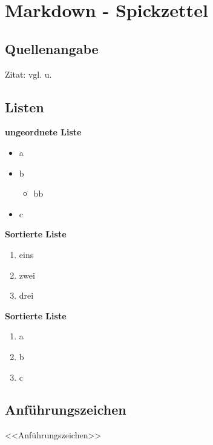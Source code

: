 \section{Markdown - Spickzettel}\label{markdown-spickzettel}

\subsection{Quellenangabe}\label{quellenangabe}

Zitat: vgl. \cite{monk_action_buch:2016} u. \cite{kofler_linux:2017}

\subsection{Listen}\label{listen}

\textbf{ungeordnete Liste}

\begin{itemize}%
\item
  a
\item
  b

  \begin{itemize}%
  \item
    bb
  \end{itemize}
\item
  c
\end{itemize}

\textbf{Sortierte Liste}

\begin{enumerate}%
\item
  eins
\item
  zwei
\item
  drei
\end{enumerate}

\textbf{Sortierte Liste}

\begin{enumerate}%
\def\labelenumi{\alph{enumi})}
\item
  a
\item
  b
\item
  c
\end{enumerate}

\subsection{Anführungszeichen}\label{anfuehrungszeichen}

<<Anführungszeichen>>

